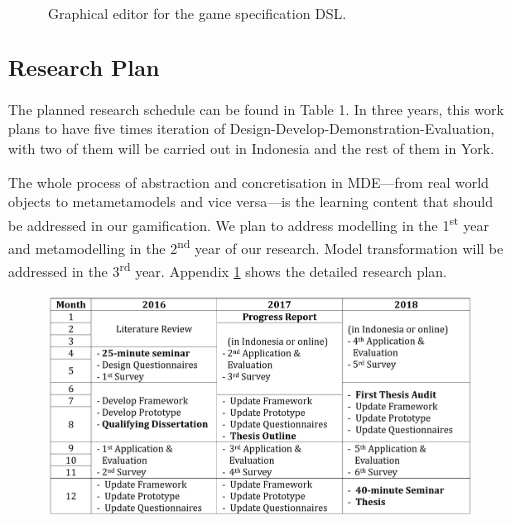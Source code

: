 \documentclass[12pt, a4paper]{report}
\begin{document}
{\begin{figure}[ht]
\centering
{}
\caption{Graphical editor for the game specification DSL.}
\label{fig:002}
\end{figure}




\begin{appendices}

\chapter{Research Plan}
\label{Research Plan}
The planned research schedule can be found in Table 1. In three years, this work plans to have five times iteration of Design-Develop-Demonstration-Evaluation, with two of them will be carried out in Indonesia and the rest of them in York.

The whole process of abstraction and concretisation in MDE---from real world objects to metametamodels and vice versa---is the learning content that should be addressed in our gamification. We plan to address modelling in the 1\textsuperscript{st} year and metamodelling in the 2\textsuperscript{nd} year of our research. Model transformation will be addressed in the 3\textsuperscript{rd} year. Appendix \ref{Research Plan} shows the detailed research plan.

\begin {table}[ht]
\caption {Research Timetable} 
\end{table}
\begin{figure}[ht]
\centering
\includegraphics[width=\textwidth]{timetable}
\end{figure}


\end{appendices}}
\end{document}

